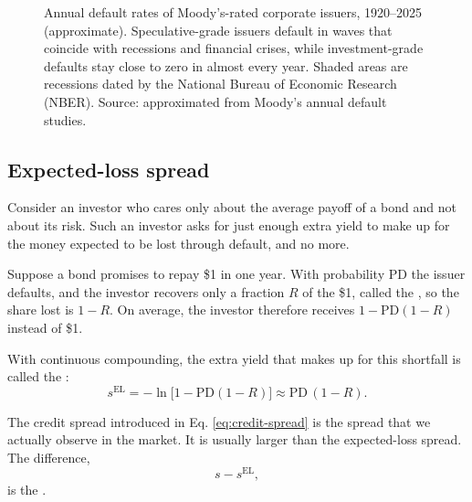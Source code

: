 \begin{figure}[htbp]
{%
}
\caption{Annual default rates of Moody's-rated corporate issuers, 1920--2025 (approximate). Speculative-grade issuers default in waves that coincide with recessions and financial crises, while investment-grade defaults stay close to zero in almost every year. Shaded areas are recessions dated by the National Bureau of Economic Research (NBER). Source: approximated from Moody's annual default studies.}
\label{fig:default-rates-time}
\end{figure}


\subsection{Expected-loss spread}

Consider an investor who cares only about the average payoff of a bond and not about its risk. Such an investor asks for just enough extra yield to make up for the money expected to be lost through default, and no more. 

Suppose a bond promises to repay \$1 in one year. With probability PD the issuer defaults, and the investor recovers only a fraction $R$ of the \$1, called the , so the share lost is $1-R$. On average, the investor therefore receives $1 - \text{PD}(1-R)$ instead of \$1. 



With continuous compounding, the extra yield that makes up for this shortfall is called the :
\begin{equation}
  s^{\text{EL}} = -\ln\bigl[1 - \text{PD}(1-R)\bigr] \approx \text{PD}\,(1-R).
  \label{eq:expected-loss-spread}
\end{equation}

The credit spread introduced in Eq. \ref{eq:credit-spread} is the spread that we actually observe in the market. It is usually larger than the expected-loss spread. The difference,
\begin{equation}
  s - s^{\text{EL}},
  \label{eq:credit-risk-premium}
\end{equation}
is the . 

